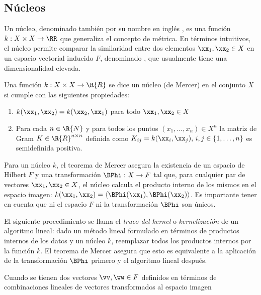 %
%
\subsection{Núcleos}
%
\iflatexml

\vspace{2em}

\fi
%
Un núcleo, denominado también por su nombre en inglés , es
una función $k:X\times{}X\rightarrow{}\RR$ \cite{stewart} que
generaliza el concepto de métrica. En términos intuitivos, el núcleo
permite comparar la similaridad entre dos elementos
$\xx_1,\xx_2\in{}X$ en un espacio vectorial inducido $F$, denominado
, que usualmente tiene una dimensionalidad elevada.

\begin{definicion}
[Núcleo]
  Una función $k:X\times{}X\rightarrow{}\R{R}$ se dice un núcleo (de
  Mercer) en el conjunto $X$ si cumple con las siguientes propiedades:
  \begin{enumerate}
  \item $k(\xx_1,\xx_2)=k(\xx_2,\xx_1)$ para todo $\xx_1,\xx_2\in{}X$
  \item Para cada $n\in\R{N}$ y para todos los puntos
    $(x_1,\ldots,x_n)\in{}X^n$ la matriz de Gram
    $K\in\R{R}^{n\times{}n}$ definida como
    $K_{ij}=k(\xx_i,\xx_j),\,i,j\in\{1,\ldots,n\}$ es semidefinida
    positiva.
  \end{enumerate}
\end{definicion}
Para un núcleo $k$, el teorema de Mercer \cite{mercer} asegura la
existencia de un espacio de Hilbert $F$ y una transformación
$\BPhi:X\rightarrow{}F$ tal que, para cualquier par de vectores
$\xx_1,\xx_2\in{}X$, el núcleo calcula el producto interno de los
mismos en el espacio imagen:
$k(\xx_1,\xx_2)=\langle\BPhi(\xx_1),\BPhi(\xx_2)\rangle$. Es
importante tener en cuenta que ni el espacio $F$ ni la transformación
$\BPhi$ son únicos.

El siguiente procedimiento se llama el \emph{truco del kernel} o
\emph{kernelización} de un algoritmo lineal: dado un método lineal
formulado en términos de productos internos de los datos y un núcleo
$k$, reemplazar todos los productos internos por la función $k$.  El
teorema de Mercer asegura que esto es equivalente a la aplicación de
la transformación $\BPhi$ primero y el algoritmo
lineal después.

Cuando se tienen dos vectores $\vv,\ww\in{}F$ definidos en términos
de combinaciones lineales de vectores transformados al espacio imagen

